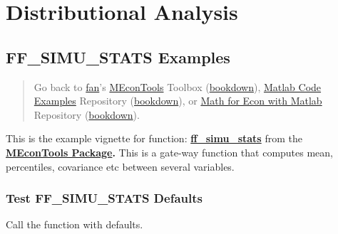 \documentclass[
]{book}
\begin{document}
\vspace{1em}

\hypertarget{distributional-analysis}{%
\chapter{Distributional Analysis}\label{distributional-analysis}}

\hypertarget{ff_simu_stats-examples}{%
\section{FF\_SIMU\_STATS Examples}\label{ff_simu_stats-examples}}

\begin{quote}
Go back to \href{http://fanwangecon.github.io/}{fan}'s \href{https://fanwangecon.github.io/MEconTools/}{MEconTools} Toolbox (\href{https://fanwangecon.github.io/MEconTools/bookdown}{bookdown}), \href{https://fanwangecon.github.io/M4Econ/}{Matlab Code Examples} Repository (\href{https://fanwangecon.github.io/M4Econ/bookdown}{bookdown}), or \href{https://fanwangecon.github.io/Math4Econ/}{Math for Econ with Matlab} Repository (\href{https://fanwangecon.github.io/Math4Econ/bookdown}{bookdown}).
\end{quote}

This is the example vignette for function:
\href{https://github.com/FanWangEcon/MEconTools/blob/master/MEconTools/stats/ff_simu_stats.m}{\textbf{ff\_simu\_stats}}
from the \href{https://fanwangecon.github.io/MEconTools/}{\textbf{MEconTools
Package}}\textbf{.} This is a
gate-way function that computes mean, percentiles, covariance etc
between several variables.

\hypertarget{test-ff_simu_stats-defaults}{%
\subsection{Test FF\_SIMU\_STATS Defaults}\label{test-ff_simu_stats-defaults}}

Call the function with defaults.
\end{document}
